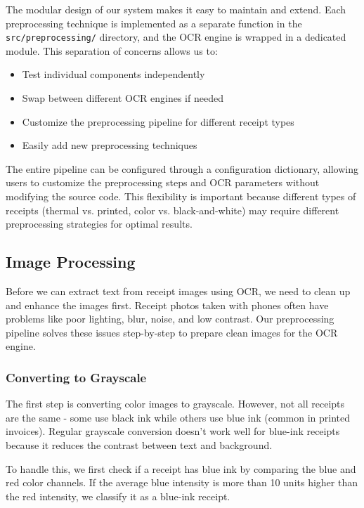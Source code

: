 The modular design of our system makes it easy to maintain and extend. Each preprocessing technique is implemented as a separate function in the \texttt{src/preprocessing/} directory, and the OCR engine is wrapped in a dedicated module. This separation of concerns allows us to:

\begin{itemize}
    \item Test individual components independently
    \item Swap between different OCR engines if needed
    \item Customize the preprocessing pipeline for different receipt types
    \item Easily add new preprocessing techniques
\end{itemize}

The entire pipeline can be configured through a configuration dictionary, allowing users to customize the preprocessing steps and OCR parameters without modifying the source code. This flexibility is important because different types of receipts (thermal vs. printed, color vs. black-and-white) may require different preprocessing strategies for optimal results.

\subsection{Image Processing}

Before we can extract text from receipt images using OCR, we need to clean up and enhance the images first. Receipt photos taken with phones often have problems like poor lighting, blur, noise, and low contrast. Our preprocessing pipeline solves these issues step-by-step to prepare clean images for the OCR engine.

\subsubsection{Converting to Grayscale}

The first step is converting color images to grayscale. However, not all receipts are the same - some use black ink while others use blue ink (common in printed invoices). Regular grayscale conversion doesn't work well for blue-ink receipts because it reduces the contrast between text and background.

To handle this, we first check if a receipt has blue ink by comparing the blue and red color channels. If the average blue intensity is more than 10 units higher than the red intensity, we classify it as a blue-ink receipt.

